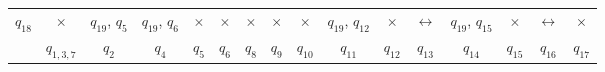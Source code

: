 \documentclass[a4paper,14pt,russian]{extarticle} %
\begin{document}
\begin{sidewaystable}
\begin{tabular}{l c c c c c c c c c c c c c c c }
			\multicolumn{1}{l|}{\({q_{18}}\)}& \multicolumn{1}{c|}{\(\times\)} & \multicolumn{1}{c|}{\({q_{19}}\), \({q_{5}}\)} & \multicolumn{1}{c|}{\({q_{19}}\), \({q_{6}}\)} & \multicolumn{1}{c|}{\(\times\)} & \multicolumn{1}{c|}{\(\times\)} & \multicolumn{1}{c|}{\(\times\)} & \multicolumn{1}{c|}{\(\times\)} & \multicolumn{1}{c|}{\(\times\)} & \multicolumn{1}{c|}{\({q_{19}}\), \({q_{12}}\)} & \multicolumn{1}{c|}{\(\times\)} & \multicolumn{1}{c|}{\(\leftrightarrow\)} & \multicolumn{1}{c|}{\({q_{19}}\), \({q_{15}}\)} & \multicolumn{1}{c|}{\(\times\)} & \multicolumn{1}{c|}{\(\leftrightarrow\)} & \multicolumn{1}{c|}{\(\times\)} \\ 
			\cline{2-16}
			& \({q_{1,3,7}}\)& \({q_{2}}\)& \({q_{4}}\)& \({q_{5}}\)& \({q_{6}}\)& \({q_{8}}\)& \({q_{9}}\)& \({q_{10}}\)& \({q_{11}}\)& \({q_{12}}\)& \({q_{13}}\)& \({q_{14}}\)& \({q_{15}}\)& \({q_{16}}\)& \({q_{17}}\)
		\end{tabular}
	\end{sidewaystable}
\end{document}
